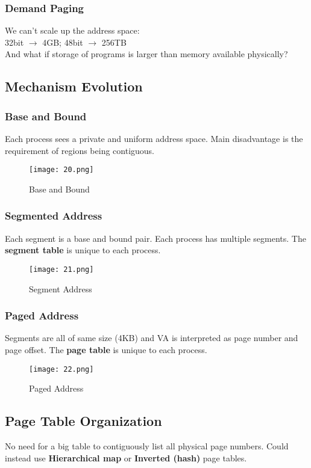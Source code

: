 \documentclass{article}
\begin{document}
\begin{multicols*}{2}
\subsubsection*{Demand Paging}
We can't scale up the address space: \\
32bit $\rightarrow$ 4GB; 48bit $\rightarrow$ 256TB \\
And what if storage of programs is larger than memory available physically?

\subsection*{Mechanism Evolution}
\subsubsection*{Base and Bound}
Each process sees a private and uniform address space. Main disadvantage is the requirement of regions being contiguous.

\begin{figure}[H]
    \centering
    {\texttt{[image: 20.png]}}
  \caption{Base and Bound}
\end{figure}

\subsubsection*{Segmented Address}
Each segment is a base and bound pair. Each process has multiple segments. The \textbf{segment table} is unique to each process.

\begin{figure}[H]
    \centering
    {\texttt{[image: 21.png]}}
  \caption{Segment Address}
\end{figure}

\subsubsection*{Paged Address}
Segments are all of same size (4KB) and VA is interpreted as page number and page offset. The \textbf{page table} is unique to each process.

\begin{figure}[H]
    \centering
    {\texttt{[image: 22.png]}}
  \caption{Paged Address}
\end{figure}

\subsection*{Page Table Organization}
No need for a big table to contiguously list all physical page numbers. Could instead use \textbf{Hierarchical map} or \textbf{Inverted (hash)} page tables.


\end{multicols*}
\end{document}
